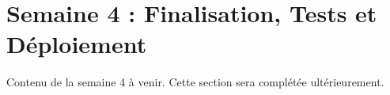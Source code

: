 \chapter{Semaine 4 : Finalisation, Tests et Déploiement}
\thispagestyle{fancy}
 
Contenu de la semaine 4 à venir. Cette section sera complétée ultérieurement. 